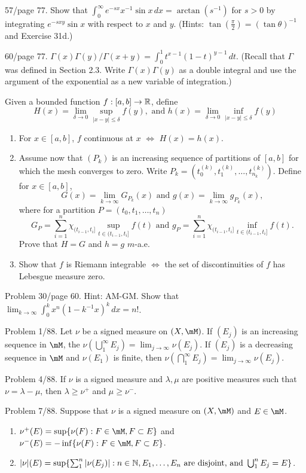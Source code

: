 \documentclass{article}
\begin{document}
 57/page 77. Show that $\int_0^\infty e^{-sx}x^{-1} \sin x \, dx = \arctan(s^{-1})$ for $s > 0$ by integrating $e^{-sxy}\sin x$ with respect to $x$ and $y$.  (Hints: $\tan(\frac \pi 2) = (\tan \theta)^{-1}$ and Exercise 31d.)

 60/page 77. $\Gamma(x) \Gamma(y)/ \Gamma(x + y) = \int_0^1 t^{x-1}(1-t)^{y-1} \, dt$. (Recall that $\Gamma$ was defined in Section 2.3. Write $\Gamma(x) \Gamma(y)$ as a double integral and use the argument of the exponential as a new variable of integration.)

 Given a bounded function $f : [a,b] \to \mathbb{R}$, define
$$ H(x) = \lim_{\delta \to 0} \sup_{|x - y| \le \delta} f(y), \text{ and } h(x) = \lim_{\delta \to 0} \inf_{|x - y| \le \delta} f(y)$$
\begin{enumerate}[\bfseries a)]
\item For $x \in [a,b]$, $f$ continuous at $x$ $\iff$ $H(x) = h(x)$.
\item Assume now that $(P_k)$ is an increasing sequence of partitions of $[a,b]$ for which the mesh converges to zero. Write $P_k = (t_0^{(k)}, t_1^{(k)}, \ldots, t_{n_k}^{(k)})$. Define for $x \in [a,b]$,
$$G(x) = \lim_{k \to \infty} G_{P_k}(x) \text{ and } g(x) = \lim_{k \to \infty} g_{P_k}(x),$$
where for a partition $P = (t_0, t_1, \ldots, t_n)$
$$G_P = \sum_{i=1}^n \chi_{(t_{i-1}, t_i]} \sup_{t \in (t_{i-1}, t_i]} f(t) \text{ and } g_P = \sum_{i=1}^n \chi_{(t_{i-1}, t_i]} \inf_{t \in (t_{i-1}, t_i]} f(t).$$
Prove that $H = G$ and $h = g$ $m$-a.e.
\item Show that $f$ is Riemann integrable $\iff$ the set of discontinuities of $f$ has Lebesgue measure zero.
\end{enumerate}

 Problem 30/page 60. Hint: AM-GM. Show that $\lim_{k \to \infty} \int_0^k x^n (1 - k^{-1} x) ^k \, dx = n!$.

 Problem 1/88. Let $\nu$ be a signed measure on $(X, \mM)$. If $(E_j)$ is an increasing sequence in $\mM$, the $\nu(\bigcup_1^\infty E_j) = \lim_{j \to \infty} \nu(E_j)$. If $(E_j)$ is a decreasing sequence in $\mM$ and $\nu(E_1)$ is finite, then $\nu(\bigcap_1^\infty E_j) = \lim_{j \to \infty} \nu(E_j)$.

 Problem 4/88. If $\nu$ is a signed measure and $\lambda, \mu$ are positive measures such that $\nu = \lambda - \mu$, then $\lambda \ge \nu^+$ and $\mu \ge \nu^-$.

 Problem 7/88. Suppose that $\nu$ is a signed measure on $(X, \mM)$ and $E \in \mM$.
\begin{enumerate}[\bfseries a.]

\item $\nu^+(E) = \sup\{\nu(F) : F \in \mM, F \subset E\}$ and $\nu^-(E) = - \inf\{\nu(F) : F \in \mM, F \subset E\}$.

\item $|\nu|(E) = \sup\{\sum_1^n |\nu(E_j)| : n \in \mathbb{N}, E_1, \ldots, E_n \text{ are disjoint, and } \bigcup_1^n E_j = E\}$.
\end{enumerate}
\end{document}
